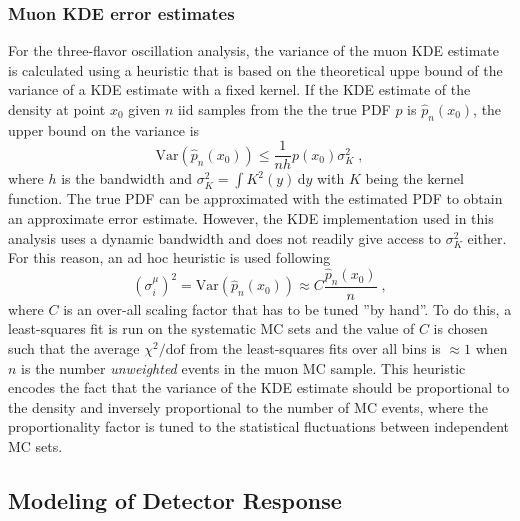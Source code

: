 \subsubsection{Muon KDE error estimates}
For the three-flavor oscillation analysis, the variance of the muon KDE estimate is calculated using a heuristic that is based on the theoretical uppe bound of the variance of a KDE estimate with a fixed kernel. If the KDE estimate of the density at point $x_0$ given $n$ iid samples from the the true PDF $p$ is $\hat{p}_n(x_0)$, the upper bound on the variance is
\begin{equation}
    \mathrm{Var}(\hat{p}_n(x_0)) \leq \frac{1}{nh}p(x_0)\sigma_K^2\;,\label{eq:kde-var-upper-bound}
\end{equation}
where $h$ is the bandwidth and $\sigma_K^2=\int K^2(y)\,\mathrm{d}y$ with $K$ being the kernel function. The true PDF can be approximated with the estimated PDF to obtain an approximate error estimate. However, the KDE implementation used in this analysis uses a dynamic bandwidth and does not readily give access to $\sigma_K^2$ either. For this reason, an ad hoc heuristic is used following
\begin{equation}
    (\sigma^{\mu}_i)^2 = \mathrm{Var}(\hat{p}_n(x_0))\approx C\frac{\hat{p}_n(x_0)}{n}\;,\label{eq:kde-var-ad-hoc}
\end{equation}
where $C$ is an over-all scaling factor that has to be tuned ''by hand''. To do this, a least-squares fit is run on the systematic MC sets and the value of $C$ is chosen such that the average $\chi^2/\mathrm{dof}$ from the least-squares fits over all bins is $\approx 1$ when $n$ is the number \emph{unweighted} events in the muon MC sample. This heuristic encodes the fact that the variance of the KDE estimate should be proportional to the density and inversely proportional to the number of MC events, where the proportionality factor is tuned to the statistical fluctuations between independent MC sets.

\subsection{Modeling of Detector Response}
\label{sec:hypersurfaces}

